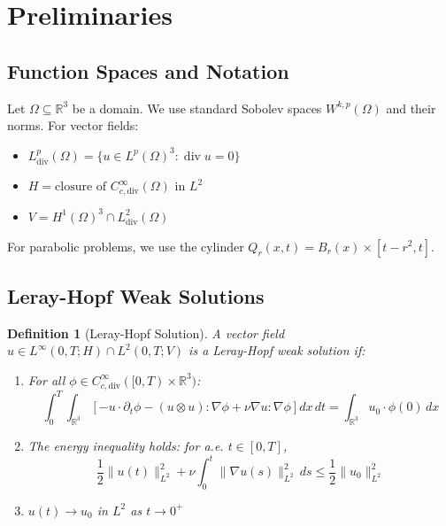 \documentclass[12pt]{article}
\newtheorem{definition}[theorem]{Definition}
\newcommand{\R}{\mathbb{R}}
\DeclareMathOperator{\divergence}{div}
\begin{document}
\section{Preliminaries}

\subsection{Function Spaces and Notation}

Let $\Omega \subseteq \R^3$ be a domain. We use standard Sobolev spaces $W^{k,p}(\Omega)$ and their norms. For vector fields:
\begin{itemize}
\item $L^p_{\text{div}}(\Omega) = \{u \in L^p(\Omega)^3 : \divergence u = 0\}$
\item $H = \text{closure of } C^\infty_{c,\text{div}}(\Omega) \text{ in } L^2$
\item $V = H^1(\Omega)^3 \cap L^2_{\text{div}}(\Omega)$
\end{itemize}

For parabolic problems, we use the cylinder $Q_r(x,t) = B_r(x) \times [t-r^2, t]$.

\subsection{Leray-Hopf Weak Solutions}

\begin{definition}[Leray-Hopf Solution]
A vector field $u \in L^\infty(0,T; H) \cap L^2(0,T; V)$ is a Leray-Hopf weak solution if:
\begin{enumerate}
\item For all $\phi \in C^\infty_{c,\text{div}}([0,T) \times \R^3)$:
\begin{equation}
\int_0^T \int_{\R^3} \left[ -u \cdot \partial_t \phi - (u \otimes u) : \nabla \phi + \nu \nabla u : \nabla \phi \right] dx\, dt = \int_{\R^3} u_0 \cdot \phi(0)\, dx
\end{equation}
\item The energy inequality holds: for a.e. $t \in [0,T]$,
\begin{equation}
\frac{1}{2}\|u(t)\|_{L^2}^2 + \nu \int_0^t \|\nabla u(s)\|_{L^2}^2\, ds \leq \frac{1}{2}\|u_0\|_{L^2}^2
\end{equation}
\item $u(t) \to u_0$ in $L^2$ as $t \to 0^+$
\end{enumerate}
\end{definition}
\end{document}
